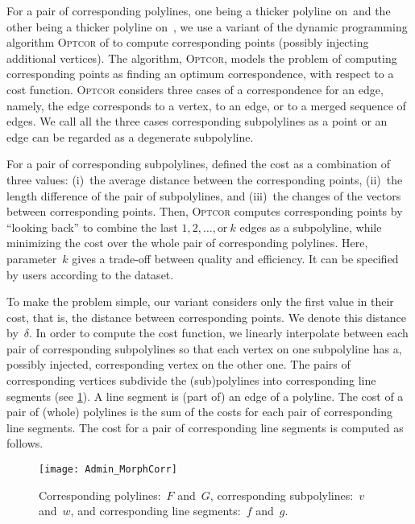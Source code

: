For a pair of corresponding polylines, 
one being a thicker polyline on~\ml and 
the other being a thicker polyline on~\ms, 
we use a variant of 
the dynamic programming algorithm \textsc{Optcor} 
of \textcite{Noellenburg2008} 
to compute corresponding points 
(possibly injecting additional
vertices).
The algorithm, \textsc{Optcor}, models the problem of 
computing corresponding points as 
finding an optimum correspondence, 
with respect to a cost function.
\textsc{Optcor} considers three cases of a 
correspondence for an edge, namely, 
the edge corresponds to a vertex, 
to an edge, or to a merged sequence of edges.
We call all the three cases corresponding subpolylines
as a point or an edge can be regarded as a degenerate subpolyline. 

For a pair of corresponding subpolylines, 
\textcite{Noellenburg2008} defined the cost 
as a combination of three values: 
(i)~the average distance between the corresponding points, 
(ii)~the length difference of the pair of subpolylines, and 
(iii)~the changes of the vectors between corresponding points. 
Then, \textsc{Optcor} computes corresponding points 
by ``looking back'' to combine 
the last $1,2,\ldots, \text{or}~k$ edges as a subpolyline, 
while minimizing the cost over 
the whole pair of corresponding polylines. 
Here, parameter~$k$ gives a trade-off between quality and efficiency.
It can be specified by users according to the dataset.


To make the problem simple, 
our variant considers only the first value in their cost, 
that is, the distance between corresponding points. 
We denote this distance by~$\delta$.  
In order to compute the cost function, we linearly
interpolate between each pair of corresponding subpolylines 
so that each vertex on one subpolyline has a, possibly injected, 
corresponding vertex on the other one.
The pairs of corresponding vertices
subdivide the (sub)polylines into corresponding line segments
(see \fig\ref{fig:Admin_BasicConcepts}).  
A line segment is (part of) an edge of a polyline. 
The cost of a pair of (whole) polylines is 
the sum of the costs for each pair of 
corresponding line segments. 
The cost for a pair of corresponding line segments 
is computed as follows.

\begin{figure}[tb]
\centering
\texttt{[image: Admin\_MorphCorr]}
\caption{Corresponding polylines:~$F$ and~$G$,
	corresponding subpolylines:~$v$ and~$w$,
	and corresponding line segments:~$f$ and~$g$.}
\label{fig:Admin_BasicConcepts}
\end{figure}

